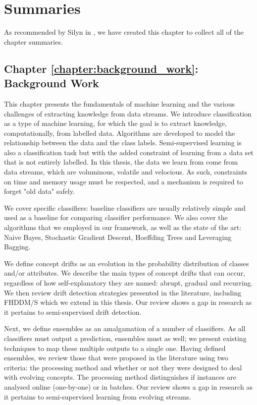 \chapter{Summaries}
As recommended by Silyn in \cite[p.~151]{silyn2012writing}, we have created this chapter to collect all of the chapter summaries.


\section{Chapter \ref{chapter:background_work}: Background Work}
This chapter presents the fundamentals of machine learning and the various challenges of extracting knowledge from data streams. We introduce classification as a type of machine learning, for which the goal is to extract knowledge, computationally, from labelled data. Algorithms are developed to model the relationship between the data and the class labels. Semi-supervised learning is also a classification task but with the added constraint of learning from a data set that is not entirely labelled. In this thesis, the data we learn from come from data streams, which are voluminous, volatile and velocious. As such, constraints on time and memory usage must be respected, and a mechanism is required to forget "old data" safely.

We cover specific classifiers: baseline classifiers are usually relatively simple and used as a baseline for comparing classifier performance. We also cover the algorithms that we employed in our framework, as well as the state of the art: Naive Bayes, Stochastic Gradient Descent, Hoeffding Trees and Leveraging Bagging.

We define concept drifts as an evolution in the probability distribution of classes and/or attributes. We describe the main types of concept drifts that can occur, regardless of how self-explanatory they are named: abrupt, gradual and recurring. We then review drift detection strategies presented in the literature, including FHDDM/S which we extend in this thesis. Our review shows a gap in research as it pertains to semi-supervised drift detection.

Next, we define ensembles as an amalgamation of a number of classifiers. As all classifiers must output a prediction, ensembles must as well; we present existing techniques to map these multiple outputs to a single one. Having defined ensembles, we review those that were proposed in the literature using two criteria: the processing method and whether or not they were designed to deal with evolving concepts. The processing method distinguishes if instances are analysed online (one-by-one) or in batches. Our review shows a gap in research as it pertains to semi-supervised learning from evolving streams.

